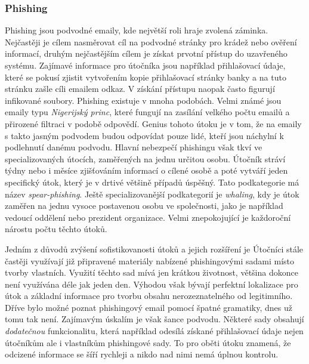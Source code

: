 \subsubsection{Phishing}
Phishing jsou podvodné emaily, kde největší roli hraje zvolená záminka.
Nejčastěji je cílem nasměrovat cíl na podvodné stránky pro krádež nebo ověření informací, druhým nejčastějším cílem je získat prvotní přístup do uzavřeného systému.
Zajímavé informace pro útočníka jsou například přihlašovací údaje, které se pokusí zjistit vytvořením kopie přihlašovací stránky banky a na tuto stránku zašle cíli emailem odkaz.
V získání přístupu naopak často figurují infikované soubory.
Phishing existuje v mnoha podobách.
Velmi známé jsou emaily typu \textit{Nigerijský princ}, které fungují na zasílání velkého počtu emailů a přirozené filtraci v podobě odpovědí.
Genius tohoto útoku je v tom, že na emaily s takto jasným podvodem budou odpovídat pouze lidé, kteří jsou náchylní k podlehnutí danému podvodu.
Hlavní nebezpečí phishingu však tkví ve specializovaných útocích, zaměřených na jednu určitou osobu.
Útočník stráví týdny nebo i měsíce zjišťováním informací o cílené osobě a poté vytváří jeden specifický útok, který je v drtivé většině případů úspěšný.
Tato podkategorie má název \textit{spear-phishing}.
Ještě specializovanější podkategorií je \textit{whaling}, kdy je útok zaměřen na jednu vysoce postavenou osobu ve společnosti, jako je například vedoucí oddělení nebo prezident organizace.
Velmi znepokojující je každoroční nárostu počtu těchto útoků.\cite{moje_bakalarka}

Jedním z důvodů zvýšení sofistikovanosti útoků a jejich rozšíření je 
Útočníci stále častěji využívají již připravené materiály nabízené phishingovými sadami místo tvorby vlastních.
Využití těchto sad mívá jen krátkou životnost, většina dokonce není využívána déle jak jeden den.
Výhodou však bývají perfektní lokalizace pro útok a základní informace pro tvorbu obsahu nerozeznatelného od legitimního.
Dříve bylo možné poznat phishingový email pomocí špatné gramatiky, dnes už tomu tak není.
Zajímavým úskalím je však šance podvodu.
Některé sady obsahují \textit{dodatečnou} funkcionalitu, která například odesílá získané přihlašovací údaje nejen útočníkům ale i vlastníkům phishingové sady.
To pro oběti útoku znamená, že odcizené informace se šíří rychleji a nikdo nad nimi nemá úplnou kontrolu.\cite{Enisa_thread_landscape}


